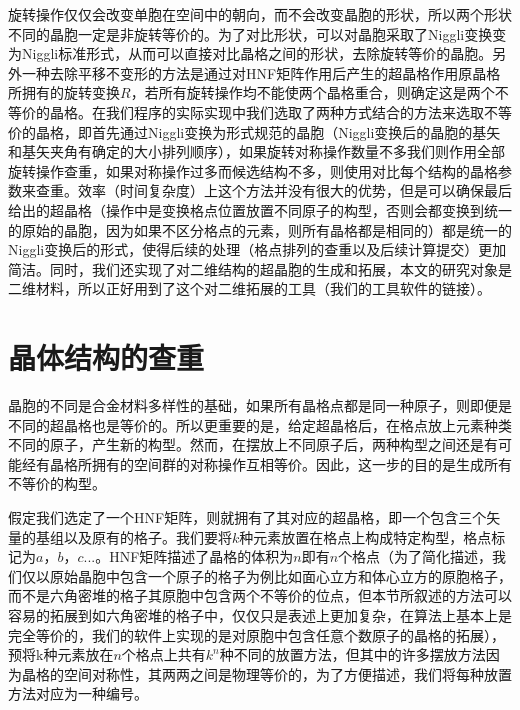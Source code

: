 旋转操作仅仅会改变单胞在空间中的朝向，而不会改变晶胞的形状，所以两个形状不同的晶胞一定是非旋转等价的。为了对比形状，可以对晶胞采取了Niggli变换\cite{kvrivy1976unified,grosse2004numerically}变为Niggli标准形式，从而可以直接对比晶格之间的形状，去除旋转等价的晶胞。另外一种去除平移不变形的方法\cite{hart2008algorithm}是通过对HNF矩阵作用后产生的超晶格作用原晶格所拥有的旋转变换$R$，若所有旋转操作均不能使两个晶格重合，则确定这是两个不等价的晶格。在我们程序的实际实现中我们选取了两种方式结合的方法来选取不等价的晶格，即首先通过Niggli变换为形式规范的晶胞（Niggli变换后的晶胞的基矢和基矢夹角有确定的大小排列顺序），如果旋转对称操作数量不多我们则作用全部旋转操作查重，如果对称操作过多而候选结构不多，则使用对比每个结构的晶格参数来查重。效率（时间复杂度）上这个方法并没有很大的优势，但是可以确保最后给出的超晶格（操作中是变换格点位置放置不同原子的构型，否则会都变换到统一的原始的晶胞，因为如果不区分格点的元素，则所有晶格都是相同的）都是统一的Niggli变换后的形式，使得后续的处理（格点排列的查重以及后续计算提交）更加简洁。同时，我们还实现了对二维结构的超晶胞的生成和拓展，本文的研究对象是二维材料，所以正好用到了这个对二维拓展的工具（我们的工具软件的链接\cite{pniggli}）。

\section{晶体结构的查重}
晶胞的不同是合金材料多样性的基础，如果所有晶格点都是同一种原子，则即便是不同的超晶格也是等价的。所以更重要的是，给定超晶格后，在格点放上元素种类不同的原子，产生新的构型。然而，在摆放上不同原子后，两种构型之间还是有可能经有晶格所拥有的空间群的对称操作互相等价。因此，这一步的目的是生成所有不等价的构型。

假定我们选定了一个HNF矩阵，则就拥有了其对应的超晶格，即一个包含三个矢量的基组以及原有的格子。我们要将$k$种元素放置在格点上构成特定构型，格点标记为$a$，$b$，$c$...。HNF矩阵描述了晶格的体积为$n$即有$n$个格点（为了简化描述，我们仅以原始晶胞中包含一个原子的格子为例比如面心立方和体心立方的原胞格子，而不是六角密堆的格子其原胞中包含两个不等价的位点，但本节所叙述的方法可以容易的拓展到如六角密堆的格子中，仅仅只是表述上更加复杂，在算法上基本上是完全等价的，我们的软件上实现的是对原胞中包含任意个数原子的晶格的拓展），预将k种元素放在$n$个格点上共有$k^n$种不同的放置方法，但其中的许多摆放方法因为晶格的空间对称性，其两两之间是物理等价的，为了方便描述，我们将每种放置方法对应为一种编号。

